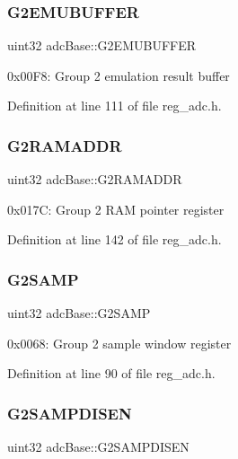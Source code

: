 \subsubsection{\texorpdfstring{G2\+E\+M\+U\+B\+U\+F\+F\+ER}{G2EMUBUFFER}}
{\footnotesize\ttfamily uint32 adc\+Base\+::\+G2\+E\+M\+U\+B\+U\+F\+F\+ER}

0x00\+F8\+: Group 2 emulation result buffer 

Definition at line 111 of file reg\+\_\+adc.\+h.

\mbox{\label{structadcBase_a9f7fa996163d406e916f1bb28ba927cd}} 
\subsubsection{\texorpdfstring{G2\+R\+A\+M\+A\+D\+DR}{G2RAMADDR}}
{\footnotesize\ttfamily uint32 adc\+Base\+::\+G2\+R\+A\+M\+A\+D\+DR}

0x017C\+: Group 2 R\+AM pointer register 

Definition at line 142 of file reg\+\_\+adc.\+h.

\mbox{\label{structadcBase_ad04c75ac0aeca79ac543a1699fa7fb9c}} 
\subsubsection{\texorpdfstring{G2\+S\+A\+MP}{G2SAMP}}
{\footnotesize\ttfamily uint32 adc\+Base\+::\+G2\+S\+A\+MP}

0x0068\+: Group 2 sample window register 

Definition at line 90 of file reg\+\_\+adc.\+h.

\mbox{\label{structadcBase_a234f42836f7b367bbf392fe87d11ebf2}} 
\subsubsection{\texorpdfstring{G2\+S\+A\+M\+P\+D\+I\+S\+EN}{G2SAMPDISEN}}
{\footnotesize\ttfamily uint32 adc\+Base\+::\+G2\+S\+A\+M\+P\+D\+I\+S\+EN}

